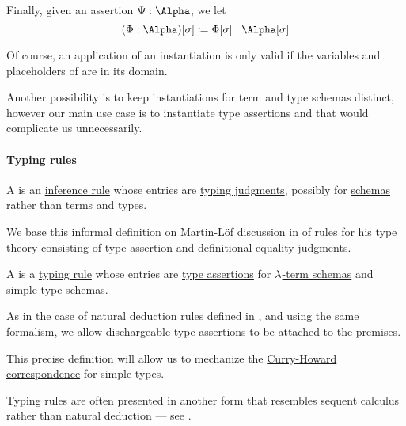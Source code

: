 \begin{definition}
\begin{thmenum}
     Finally, given an assertion \( \Psi: \Alpha \), we let
    \begin{equation}\label{eq:def:lambda_schema_instantiation/assertion}
      (\Phi: \Alpha)[\sigma] \coloneqq \Phi[\sigma]: \Alpha[\sigma]
    \end{equation}
  \end{thmenum}
\end{definition}
\begin{comments}
  \item Of course, an application of an instantiation is only valid if the variables and placeholders of are in its domain.

  \item Another possibility is to keep instantiations for term and type schemas distinct, however our main use case is to instantiate type assertions and that would complicate us unnecessarily.
\end{comments}

\paragraph{Typing rules}

\begin{concept}\label{con:typing_rule}
  A  is an \hyperref[def:inference_rule]{inference rule} whose entries are \hyperref[rem:typing_judgments]{typing judgments}, possibly for \hyperref[con:schemas_and_instances]{schemas} rather than terms and types.
\end{concept}
\begin{comments}
  \item We base this informal definition on Martin-L\"of discussion in \cite{MartinLöf1984IntTypeTheory} of rules for his type theory consisting of \hyperref[def:type_assertion]{type assertion} and \hyperref[con:definitional_equality]{definitional equality} judgments.
\end{comments}

\begin{definition}\label{def:simple_typing_rule}\mimprovised
  A  is a \hyperref[con:typing_rule]{typing rule} whose entries are \hyperref[def:type_assertion]{type assertions} for \hyperref[def:lambda_term_schema]{\( \mathrm{\lambda} \)-term schemas} and \hyperref[def:simple_type_schema]{simple type schemas}.

  As in the case of natural deduction rules defined in , and using the same formalism, we allow dischargeable type assertions to be attached to the premises.
\end{definition}
\begin{comments}
  \item This precise definition will allow us to mechanize the \hyperref[con:curry_howard_correspondence]{Curry-Howard correspondence} for simple types.

  \item Typing rules are often presented in another form that resembles sequent calculus rather than natural deduction --- see .
\end{comments}

